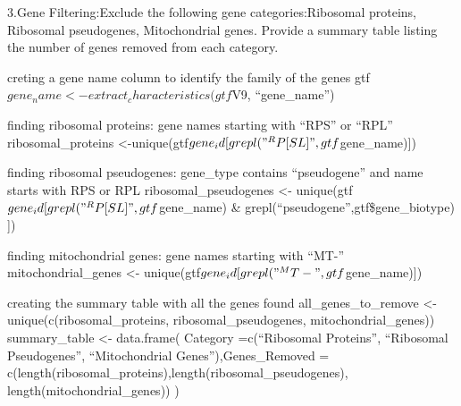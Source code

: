 \documentclass[
  ignorenonframetext,
]{beamer}
\begin{document}
\begin{frame}{3.Gene Filtering:Exclude the following gene
categories:Ribosomal proteins, Ribosomal pseudogenes, Mitochondrial
genes. Provide a summary table listing the number of genes removed from
each category.}
\label{gene-filteringexclude-the-following-gene-categoriesribosomal-proteins-ribosomal-pseudogenes-mitochondrial-genes.-provide-a-summary-table-listing-the-number-of-genes-removed-from-each-category.}
\begin{block}{creting a gene name column to identify the family of the
genes}
\label{creting-a-gene-name-column-to-identify-the-family-of-the-genes}
gtf\(gene_name <- extract_characteristics(gtf\)V9, ``gene\_name'')
\end{block}

\begin{block}{finding ribosomal proteins: gene names starting with
``RPS'' or ``RPL''}
\label{finding-ribosomal-proteins-gene-names-starting-with-rps-or-rpl}
ribosomal\_proteins
\textless-unique(gtf\(gene_id[grepl("^RP[SL]", gtf\)gene\_name){]})
\end{block}

\begin{block}{finding ribosomal pseudogenes: gene\_type contains
``pseudogene'' and name starts with RPS or RPL}
\label{finding-ribosomal-pseudogenes-gene_type-contains-pseudogene-and-name-starts-with-rps-or-rpl}
ribosomal\_pseudogenes \textless-
unique(gtf\(gene_id[grepl("^RP[SL]", gtf\)gene\_name) \&
grepl(``pseudogene'',gtf\$gene\_biotype) {]})
\end{block}

\begin{block}{finding mitochondrial genes: gene names starting with
``MT-''}
\label{finding-mitochondrial-genes-gene-names-starting-with-mt-}
mitochondrial\_genes \textless-
unique(gtf\(gene_id[grepl("^MT-", gtf\)gene\_name){]})
\end{block}

\begin{block}{creating the summary table with all the genes found}
\label{creating-the-summary-table-with-all-the-genes-found}
all\_genes\_to\_remove \textless- unique(c(ribosomal\_proteins,
ribosomal\_pseudogenes, mitochondrial\_genes)) summary\_table \textless-
data.frame( Category =c(``Ribosomal Proteins'', ``Ribosomal
Pseudogenes'', ``Mitochondrial Genes''),Genes\_Removed =
c(length(ribosomal\_proteins),length(ribosomal\_pseudogenes),
length(mitochondrial\_genes)) )


\end{block}
\end{frame}
\end{document}
